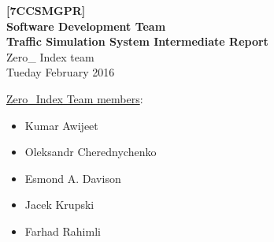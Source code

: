 \begin{titlepage}
    \begin{center}
        \vspace*{6cm}
        \noindent\makebox[\linewidth]{\rule{\paperwidth}{0.4pt}}
        \Huge
        \textbf{[7CCSMGPR]\\Software Development Team\\}
        \vspace{0.5cm}
        \Large
        \textbf{Traffic Simulation System Intermediate Report\\}
        \vspace{1.5cm}
        \large
        \textsf{Zero\_ Index team\\}
        \vspace{1cm}
        \textsf{Tueday  February 2016}
        \noindent\makebox[\linewidth]{\rule{\paperwidth}{0.4pt}}
        \vfill
	\end{center}
	\vspace{1cm}
	\underline{\textsf{Zero\_Index Team members}}:
	\begin{itemize}
		\item Kumar Awijeet
		\item Oleksandr Cherednychenko
		\item Esmond A. Davison
		\item Jacek Krupski
		\item Farhad Rahimli
	\end{itemize}
\end{titlepage}



